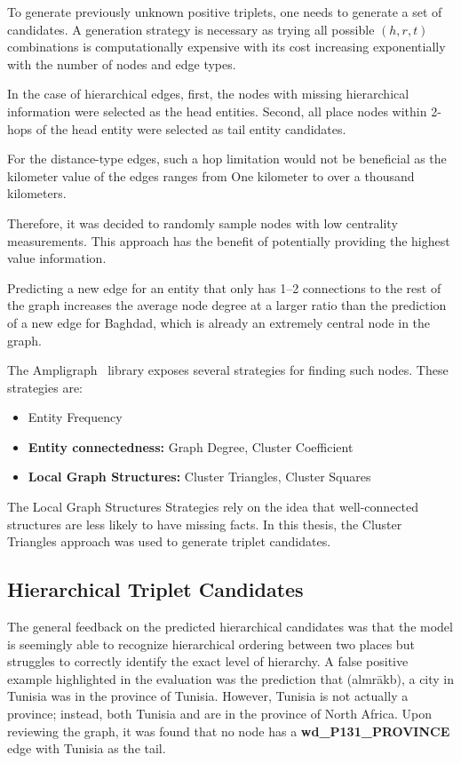 To generate previously unknown positive triplets, one needs to generate a set of candidates.
A generation strategy is necessary as trying all possible $(h,r,t)$ combinations is computationally expensive
with its cost increasing exponentially with the number of nodes and edge types.

In the case of hierarchical edges, first,
the nodes with missing hierarchical information were selected as the head entities.
Second, all place nodes within 2-hops of the head entity were selected as tail entity candidates.

For the distance-type edges, such a hop limitation would not be beneficial as the kilometer value of the edges ranges from
One kilometer to over a thousand kilometers.

Therefore, it was decided to randomly sample nodes with low centrality measurements.
This approach has the benefit of potentially providing the highest value information.

Predicting a new edge for an entity that only has 1--2 connections to the rest of the graph
increases the average node degree at a larger ratio than the prediction of a new edge for Baghdad, which is
already an extremely central node in the graph.

The Ampligraph~\cite{ampligraph} library exposes several strategies for finding such nodes.
These strategies are:
\begin{itemize}
    \item Entity Frequency
    \item \textbf{Entity connectedness:} Graph Degree, Cluster Coefficient
    \item  \textbf{Local Graph Structures:} Cluster Triangles, Cluster Squares
\end{itemize}


The Local Graph Structures Strategies rely on the idea that well-connected structures are less likely to have missing facts.
In this thesis, the Cluster Triangles approach was used to generate triplet candidates.

\subsection{Hierarchical Triplet Candidates}
The general feedback on the predicted hierarchical candidates was that the model is seemingly able to recognize hierarchical
ordering between two places but struggles to correctly identify the exact level of hierarchy.
A false positive example highlighted in the evaluation was the prediction that
 (almrākb), a city in Tunisia was in the province of Tunisia.
However, Tunisia is not actually a province; instead, both Tunisia and  are in the province of North Africa.
Upon reviewing the graph, it was found that no node has a \textbf{wd\_P131\_PROVINCE} edge with Tunisia as the tail.

